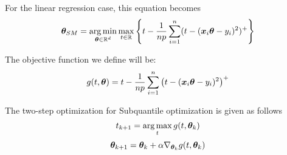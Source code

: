 \documentclass{article} %
\begin{document}
	For the linear regression case, this equation becomes 
	\begin{equation}
		\label{eqn:theta_sm}
		{\bm{\theta}}_{SM} = \operatorname*{arg\,min}_{{\bm{\theta}} \in \mathbb{R}^d} \max_{t \in \mathbb{R}} \left\{t - \frac{1}{np}\sum_{i=1}^n(t-({\bm{x}}_i {\bm{\theta}} - y_i)^2)^+\right\}
	\end{equation}
	
	The objective function we define will be: 
	\begin{equation}
		g(t,{\bm{\theta}}) = t - \frac{1}{np} \sum_{i=1}^n\left(t - ({\bm{x}}_i {\bm{\theta}} - y_i)^2\right)^+
	\end{equation}
		
	The two-step optimization for Subquantile optimization is given as follows \vspace{1em}
	\begin{equation}
		\label{eqn:t-update}
		t_{k+1} = \operatorname*{arg\,max}_t g(t,{\bm{\theta}}_k) 
	\end{equation}
	\begin{equation}
		\label{eqn:theta-update}
		{\bm{\theta}}_{k+1} = {\bm{\theta}}_k + \alpha \nabla_{{\bm{\theta}}_k} g(t,{\bm{\theta}}_k)
	\end{equation}
		
\end{document}
